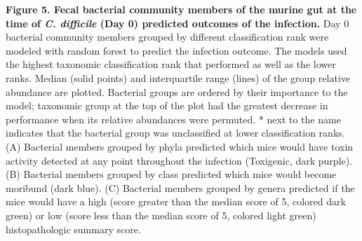 \documentclass[
  12pt,
]{article}
\begin{document}
\textbf{Figure 5. Fecal bacterial community members of the murine gut at
the time of \emph{C. difficile} (Day 0) predicted outcomes of the
infection.} Day 0 bacterial community members grouped by different
classification rank were modeled with random forest to predict the
infection outcome. The models used the highest taxonomic classification
rank that performed as well as the lower ranks. Median (solid points)
and interquartile range (lines) of the group relative abundance are
plotted. Bacterial groups are ordered by their importance to the model;
taxonomic group at the top of the plot had the greatest decrease in
performance when its relative abundances were permuted. * next to the
name indicates that the bacterial group was unclassified at lower
classification ranks. (A) Bacterial members grouped by phyla predicted
which mice would have toxin activity detected at any point throughout
the infection (Toxigenic, dark purple). (B) Bacterial members grouped by
class predicted which mice would become moribund (dark blue). (C)
Bacterial members grouped by genera predicted if the mice would have a
high (score greater than the median score of 5, colored dark green) or
low (score less than the median score of 5, colored light green)
histopathologic summary score.

\hfill\break
\end{document}
